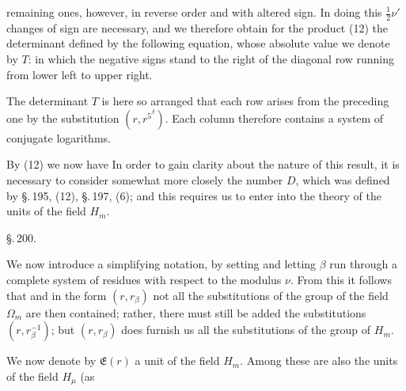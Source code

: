 remaining ones, however, in reverse order and with altered sign.
In doing this $\frac{1}{2}\nu'$ changes of sign are necessary,
and we therefore obtain for the product (12) the determinant
defined by the following equation, whose absolute value we
denote by $T$:
in which the negative signs stand to the right of the diagonal row
running from lower left to upper right.

The determinant $T$ is here so arranged that each row
arises from the preceding one by the substitution $(r, r^{5^\beta})$.
Each column therefore contains a system of conjugate logarithms.

By (12) we now have
In order to gain clarity about the nature of this result,
it is necessary to consider somewhat more closely the number $D$, which was
defined by \S.\,195, (12), \S.\,197, (6); and this requires us to enter
 into the theory of the units of the field $H_m$.

\begin{center}
\S.\,200.\\
\end{center}

We now introduce a simplifying notation, by setting
and letting $\beta$ run through a complete system of residues with respect to the modulus $\nu$.
 From this it follows that
and in the form $(r, r_\beta)$ not all the substitutions
of the group of the field $\Omega_m$ are then contained; rather, there
must still be added the substitutions $(r, r_\beta^{-1})$; but
$(r, r_\beta)$ does furnish us all the substitutions of the group of $H_m$.

We now denote by $\mathfrak{E}(r)$ a unit of the field $H_m$.
Among these are also the units of the field $H_\mu$ (as
